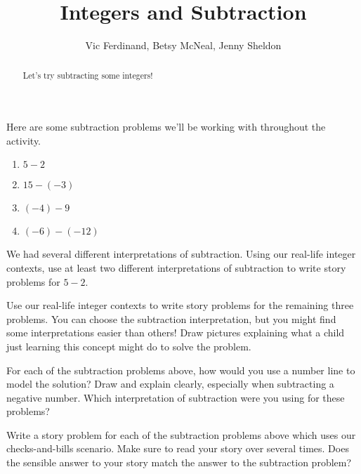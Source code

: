 \documentclass{ximera}
\title{Integers and Subtraction}
\author{Vic Ferdinand, Betsy McNeal, Jenny Sheldon}
\begin{document}
\begin{abstract}
    Let's try subtracting some integers!
\end{abstract}
\maketitle



Here are some subtraction problems we'll be working with throughout the activity.

\begin{enumerate}
    \item $5 - 2$
    \item $15 - (-3)$
    \item $(-4) - 9$
    \item $(-6) - (-12)$
\end{enumerate}

\begin{problem}
We had several different interpretations of subtraction.  Using our real-life integer contexts, use at least two different interpretations of subtraction to write story problems for $5 - 2$.

\end{problem}

\begin{problem}
Use our real-life integer contexts to write story problems for the remaining three problems.  You can choose the subtraction interpretation, but you might find some interpretations easier than others!  Draw pictures explaining what a child just learning this concept might do to solve the problem.


\end{problem}

\begin{problem}
For each of the subtraction problems above, how would you use a number line to model the solution?  Draw and explain clearly, especially when subtracting a negative number.  Which interpretation of subtraction were you using for these problems?
\end{problem}

\begin{problem}
Write a story problem for each of the subtraction problems above which uses our checks-and-bills scenario.  Make sure to read your story over several times.  Does the sensible answer to your story match the answer to the subtraction problem?
\end{problem}
\end{document}
